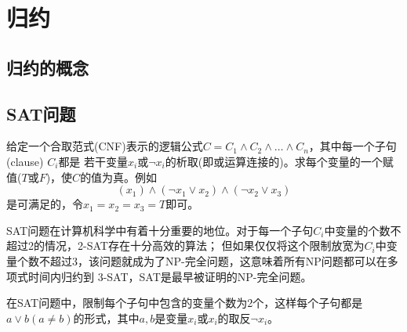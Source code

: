 \chapter{归约}


\section{归约的概念}








\section{SAT问题}

\begin{prob}
 给定一个合取范式(CNF)表示的逻辑公式$C = C_1 \land C_2 \land \ldots \land C_n$，其中每一个子句(clause) $C_i$都是
 若干变量$x_i$或$\neg x_i$的析取(即或运算连接的)。求每个变量的一个赋值($T$或$F$)，使$C$的值为真。例如
 $$(x_1)\land(\neg x_1 \lor x_2)\land(\neg x_2 \lor x_3)$$
 是可满足的，令$x_1=x_2=x_3=T$即可。
\end{prob}

SAT问题在计算机科学中有着十分重要的地位。对于每一个子句$C_i$中变量的个数不超过2的情况，2-SAT存在十分高效的算法；
但如果仅仅将这个限制放宽为$C_i$中变量个数不超过3，该问题就成为了NP-完全问题，这意味着所有NP问题都可以在多项式时间内归约到
3-SAT，SAT是最早被证明的NP-完全问题。

\begin{prob}[2-SAT]
 在SAT问题中，限制每个子句中包含的变量个数为2个，这样每个子句都是$a\lor b (a \neq b)$的形式，其中$a, b$是变量$x_i$或$x_i$的取反$\neg x_i$。
\end{prob}

